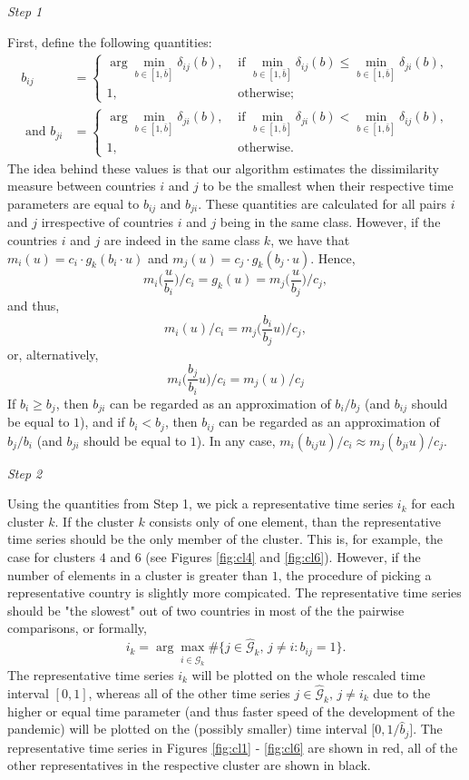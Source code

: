 \documentclass[a4paper,11pt]{article}
\numberwithin{equation}{section}
\begin{document}
\textit{Step 1}

First, define the following quantities:
\begin{align*}
b_{ij} &= \begin{cases}
\arg \min_{b \in [1, \bar{b}]} \delta_{ij}(b),  &\text{ if } \min_{b \in [1, \bar{b}]} \delta_{ij}(b) \leq \min_{b \in [1, \bar{b}]} \delta_{ji}(b), \\
1, &\text{ otherwise};
\end{cases}\\
 \text{ and } b_{ji} &=\begin{cases}
\arg \min_{b \in [1, \bar{b}]} \delta_{ji}(b),  &\text{ if } \min_{b \in [1, \bar{b}]} \delta_{ji}(b) < \min_{b \in [1, \bar{b}]} \delta_{ij}(b), \\
1, &\text{ otherwise}.
\end{cases}
\end{align*}
The idea behind these values is that our algorithm estimates the dissimilarity measure between countries $i$ and $j$ to be the smallest when their respective time parameters are equal to $b_{ij}$ and $b_{ji}$. These quantities are calculated for all pairs $i$ and $j$ irrespective of countries $i$ and $j$ being in the same class. However, if the countries $i$ and $j$ are indeed in the same class $k$, we have that $m_i(u) = c_i \cdot g_k (b_i \cdot u)$ and $m_j(u) = c_j \cdot g_k( b_j \cdot u)$. Hence,
$$m_i \Big( \frac{u}{b_i} \Big) / c_i= g_k (u) = m_j \Big( \frac{u}{b_j} \Big) /c_j,$$
and thus,
$$m_i (u) / c_i = m_j \Big( \frac{b_i}{b_j} u \Big) /c_j,$$
or, alternatively,
$$m_i\Big( \frac{b_j}{b_i} u \Big) /c_i = m_j (u) / c_j$$
If $b_i \geq b_j$, then $b_{ji}$ can be regarded as an approximation of $b_i / b_j$ (and $b_{ij}$ should be equal to $1$), and if $b_i < b_j$, then $b_{ij}$ can be regarded as an approximation of $b_j/b_i$ (and $b_{ji}$ should be equal to $1$). In any case, $m_i( b_{ij} u ) /c_i \approx m_j (b_{ji} u) / c_j$.

\textit{Step 2}

Using the quantities from Step 1, we pick a representative time series $i_k$ for each cluster $k$. If the cluster $k$ consists only of one element, than the representative time series should be the only member of the cluster. This is, for example, the case for clusters $4$ and $6$ (see Figures \ref{fig:cl4} and \ref{fig:cl6}). However, if the number of elements in a cluster is greater than $1$, the procedure of picking a representative country is slightly more compicated. The representative time series should be "the slowest" out of two countries in most of the the pairwise comparisons, or formally,
$$i_k = \arg \max_{i \in \widehat{\mathcal{G}}_k} \# \{j \in \widehat{\mathcal{G}}_k, \, j\neq i: b_{ij} = 1\}.$$
The representative time series $i_k$ will be plotted on the whole rescaled time interval $[0, 1]$, whereas all of the other time series $j \in \widehat{\mathcal{G}}_k,\, j \neq i_k$ due to the higher or equal time parameter (and thus faster speed of the development of the pandemic) will be plotted on the (possibly smaller) time interval $\big[ 0, 1/\hat{b}_j \big]$. The representative time series in Figures \ref{fig:cl1} - \ref{fig:cl6} are shown in red, all of the other representatives in the respective cluster are shown in black.
\end{document}
